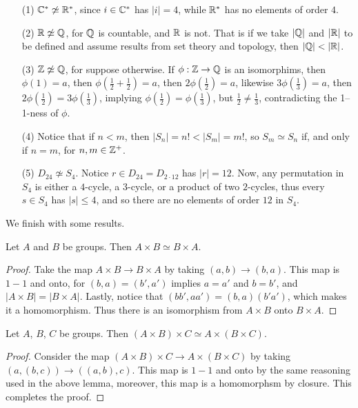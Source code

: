 \begin{example}\label{example_1.15}
  \begin{enumerate}
    \item[(1)] $\mathbb{C}^* \not\simeq \mathbb{R}^*$, since $i \in \mathbb{C}^*$ has $|i|=4$,
      while $\mathbb{R}^*$ has no elements of order  $4$.

    \item [(2)] $\mathbb{R} \not\simeq \mathbb{Q}$, for  $\mathbb{Q}$ is countable, and  $\mathbb{R}$ is
      not. That is if we take  $|\mathbb{Q}|$ and $|\mathbb{R}|$ to be defined and
      assume results from set theory and topology, then $|\Q|<|\R|$.

    \item[(3)] $\mathbb{Z} \not\simeq \mathbb{Q}$, for suppose otherwise. If  $\phi:\mathbb{Z}
      \rightarrow \mathbb{Q}$ is an isomorphims, then $\phi(1)=a$, then
      $\phi(\frac{1}{2}+\frac{1}{2})=a$, then $2\phi(\frac{1}{2})=a$,
      likewise $3\phi(\frac{1}{3})=a$, then $2\phi(\frac{1}{2})=
      3\phi(\frac{1}{3})$, implying $\phi(\frac{1}{2})=\phi(\frac{1}{3})$,
      but $\frac{1}{2} \neq \frac{1}{3}$, contradicting the 1--1-ness of
      $\phi$.

    \item[(4)] Notice that if $n<m$, then  $|S_n|=n!<|S_m|=m!$, so
      $S_m \simeq S_n$ if, and only if  $n=m$, for $n,m \in \mathbb{Z}^+$.

    \item[(5)] $D_{24} \not\simeq S_4$. Notice $r \in D_{24}=D_{2 \cdot 12}$
      has $|r|=12$. Now, any permutation in $S_4$ is either a
      $4$-cycle, a  $3$-cycle, or a product of two  $2$-cycles, thus every
      $s \in S_4$ has $|s| \leq 4$, and so there are no elements of
      order $12$ in  $S_4$.
  \end{enumerate}
\end{example}

We finish with some results.

\begin{lemma}\label{lemma_1.5.5}
  Let $A$ and  $B$ be groups. Then  $A \times B \simeq B \times A$.
\end{lemma}
\begin{proof}
  Take the map $A \times B \rightarrow B \times A$ by taking $(a,b)
  \rightarrow (b,a)$. This map is $1-1$ and onto, for $(b,a)=(b',a')$ implies
  $a=a'$ and  $b=b'$, and  $|A \times B|=|B \times A|$. Lastly,
  notice that $(bb',aa')=(b,a)(b'a')$, which makes it a homomorphism. Thus
  there is an isomorphism from  $A \times B$ onto  $B \times A$.
\end{proof}

\begin{lemma}\label{lemma_1.5.7}
  Let $A$,  $B$,  $C$ be groups. Then  $(A \times B) \times C \simeq A \times
  (B \times C)$.
\end{lemma}
\begin{proof}
  Consider the map $(A \times B) \times C \rightarrow A \times (B \times C)$
  by taking $(a,(b,c)) \rightarrow ((a,b),c)$. This map is $1-1$ and onto by
  the same reasoning used in the above lemma, moreover, this map is a
  homomorphsm by closure. This completes the proof.
\end{proof}
